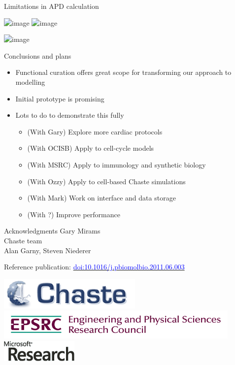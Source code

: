 \documentclass[t,xcolor={usenames,dvipsnames}]{beamer}
\newcommand{\myhref}[2]{\href{#1}{\textcolor{Blue}{#2}}}
\newcommand{\doi}[1]{\myhref{http://dx.doi.org/#1}{doi:#1}}
\begin{document}
\begin{frame}{Limitations in APD calculation}
\begin{center}
\includegraphics<1>{faber_rudy_2000_s1s2_curve}
\includegraphics<2>[height=.9\textheight]{faber_rudy_2000_COR_comparison}
\end{center}
\includegraphics<3>[height=.8\textheight]{nygren_s1s2_V}
\end{frame}

\begin{frame}{Conclusions and plans}
\begin{itemize}
\item Functional curation offers great scope for transforming our approach to modelling
\item Initial prototype is promising
\item Lots to do to demonstrate this fully
  \begin{itemize}
  \item (With Gary) Explore more cardiac protocols
  \item (With OCISB) Apply to cell-cycle models
  \item (With MSRC) Apply to immunology and synthetic biology
  \item (With Ozzy) Apply to cell-based Chaste simulations
  \item (With Mark) Work on interface and data storage
  \item (With ?) Improve performance
  \end{itemize}
\end{itemize}
\end{frame}


\begin{frame}{Acknowledgments}
Gary Mirams\\
Chaste team\\
Alan Garny, Steven Niederer

Reference publication: \doi{10.1016/j.pbiomolbio.2011.06.003}

\begin{center}
\includegraphics[scale=.9]{chaste-266x60}\\ \vspace{.4cm}
\includegraphics[width=.55\textwidth]{EPSRC1RGBLO} \hspace{.1cm}
\includegraphics[scale=.55]{logo_msr}
\end{center}
\end{frame}
\end{document}
